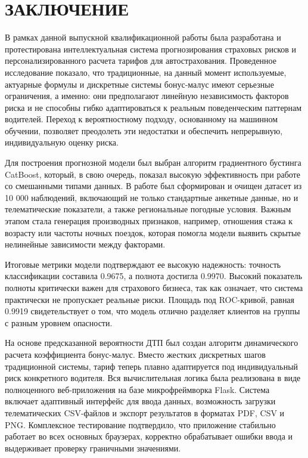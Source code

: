 \section*{ЗАКЛЮЧЕНИЕ}

В рамках данной выпускной квалификационной работы была разработана и протестирована интеллектуальная система прогнозирования страховых рисков и персонализированного расчета тарифов для автострахования. Проведенное исследование показало, что традиционные, на данный момент используемые, актуарные формулы и дискретные системы бонус-малус имеют серьезные ограничения, а именно: они предполагают линейную независимость факторов риска и не способны гибко адаптироваться к реальным поведенческим паттернам водителей. Переход к вероятностному подходу, основанному на машинном обучении, позволяет преодолеть эти недостатки и обеспечить непрерывную, индивидуальную оценку риска.

Для построения прогнозной модели был выбран алгоритм градиентного бустинга CatBoost, который, в свою очередь, показал высокую эффективность при работе со смешанными типами данных. В работе был сформирован и очищен датасет из 10 000 наблюдений, включающий не только стандартные анкетные данные, но и телематические показатели, а также региональные погодные условия. Важным этапом стала генерация производных признаков, например, отношения стажа к возрасту или частоты ночных поездок, которая помогла модели выявить скрытые нелинейные зависимости между факторами. 

Итоговые метрики модели подтверждают ее высокую надежность: точность классификации составила 0.9675, а полнота достигла 0.9970. Высокий показатель полноты критически важен для страхового бизнеса, так как означает, что система практически не пропускает реальные риски. Площадь под ROC-кривой, равная 0.9919 свидетельствует о том, что модель отлично разделяет клиентов на группы с разным уровнем опасности.

На основе предсказанной вероятности ДТП был создан алгоритм динамического расчета коэффициента бонус-малус. Вместо жестких дискретных шагов традиционной системы, тариф теперь плавно адаптируется под индивидуальный риск конкретного водителя. Вся вычислительная логика была реализована в виде полноценного веб-приложения на базе микрофреймворка Flask. Система включает адаптивный интерфейс для ввода данных, возможность загрузки телематических CSV-файлов и экспорт результатов в форматах PDF, CSV и PNG. Комплексное тестирование подтвердило, что приложение стабильно работает во всех основных браузерах, корректно обрабатывает ошибки ввода и выдерживает проверку граничными значениями.

